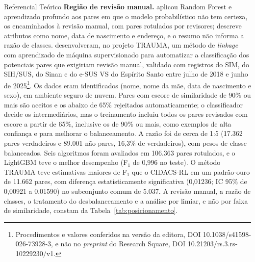 \begin{chapter}{Referencial Teórico}
\textbf{Região de revisão manual.}  aplicou Random Forest e aprendizado profundo aos pares em que o modelo probabilístico não tem certeza, os encaminhados à revisão manual, com pares rotulados por revisores; descreve atributos como nome, data de nascimento e endereço, e o resumo não informa a razão de classes.  desenvolveram, no projeto TRAUMA, um método de \textit{linkage} com aprendizado de máquina supervisionado para automatizar a classificação dos potenciais pares que exigiriam revisão manual, validado com registros do SIM, do SIH/SUS, do Sinan e do e-SUS VS do Espírito Santo entre julho de 2018 e junho de 2025\footnote{Procedimentos e valores conferidos na versão da editora, DOI 10.1038/s41598-026-73928-3, e não no \textit{preprint} do Research Square, DOI 10.21203/rs.3.rs-10229230/v1.}. Os dados eram identificados (nome, nome da mãe, data de nascimento e sexo), em ambiente seguro de nuvem. Pares com escore de similaridade de 90\% ou mais são aceitos e os abaixo de 65\% rejeitados automaticamente; o classificador decide os intermediários, mas o treinamento incluiu todos os pares revisados com escore a partir de 65\%, inclusive os de 90\% ou mais, como exemplos de alta confiança e para melhorar o balanceamento. A razão foi de cerca de 1:5 (17.362 pares verdadeiros e 89.001 não pares, 16,3\% de verdadeiros), com pesos de classe balanceados. Seis algoritmos foram avaliados em 106.363 pares rotulados, e o LightGBM teve o melhor desempenho (F$_1$ de 0,996 no teste). O método TRAUMA teve estimativas maiores de F$_1$ que o CIDACS-RL em um padrão-ouro de 11.662 pares, com diferença estatisticamente significativa (0,01236; IC 95\% de 0,00921 a 0,01590) no subconjunto comum de 5.037. A revisão manual, a razão de classes, o tratamento do desbalanceamento e a análise por limiar, e não por faixa de similaridade, constam da Tabela~\ref{tab:posicionamento}.


\end{chapter}
